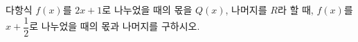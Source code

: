 다항식 $f(x)$를 $2x+1$로 나누었을 때의 몫을 $Q(x)$, 나머지를 $R$라 할 때, $f(x)$를 $x+\dfrac{1}{2}$로 나누었을 때의 몫과 나머지를 구하시오.
